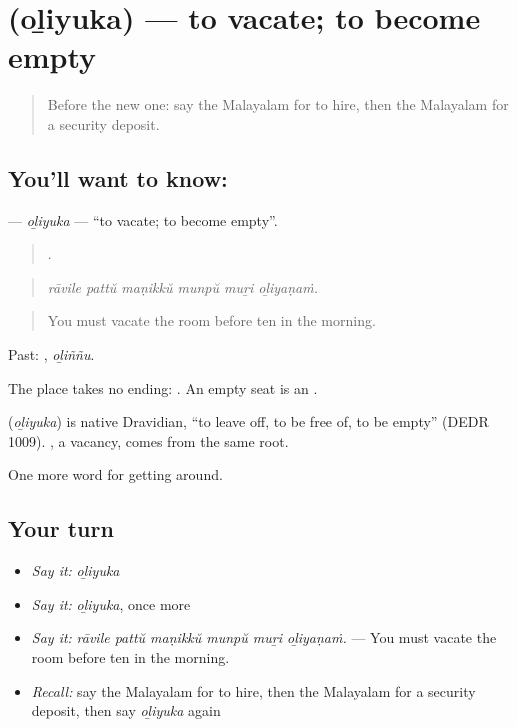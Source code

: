 \section[\texorpdfstring{\ml{ഒഴിയുക} (oḻiyuka)}{ഒഴിയുക (oḻiyuka)}]{ (oḻiyuka) — to vacate; to become empty}

\label{lesson:ML-C482-oliyuka}



\begin{quote}
Before the new one: say the Malayalam for to hire, then the Malayalam for a security deposit.
\end{quote}

\subsection*{You'll want to know: }
\textbf{} — \emph{oḻiyuka} — \textquotedblleft{}to vacate; to become empty\textquotedblright{}.

\begin{quote}
     .
\end{quote}

\begin{quote}
\emph{rāvile pattŭ maṇikkŭ munpŭ muṟi oḻiyaṇaṁ.}
\end{quote}

\begin{quote}
You must vacate the room before ten in the morning.
\end{quote}

Past: , \emph{oḻiññu}.

The place takes no ending:  . An empty seat is an  .

\begin{cousinweb}
\textbf{} (\emph{oḻiyuka}) is native Dravidian, \textquotedblleft{}to leave off, to be free of, to be empty\textquotedblright{} (DEDR 1009). , a vacancy, comes from the same root.
\end{cousinweb}

\begin{grammarlens}[title={What you've built}]
One more word for getting around.
\end{grammarlens}

\subsection*{Your turn}
\begin{itemize}
\raggedright
  \item \emph{Say it:} \emph{oḻiyuka}
  \item \emph{Say it:} \emph{oḻiyuka}, once more
  \item \emph{Say it:} \emph{rāvile pattŭ maṇikkŭ munpŭ muṟi oḻiyaṇaṁ.} — You must vacate the room before ten in the morning.
  \item \emph{Recall:} say the Malayalam for to hire, then the Malayalam for a security deposit, then say \emph{oḻiyuka} again
\end{itemize}

